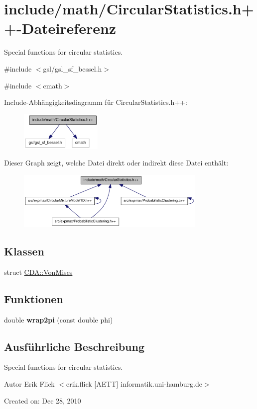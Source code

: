 \hypertarget{CircularStatistics_8h_09_09}{
\section{include/math/CircularStatistics.h++-\/Dateireferenz}
\label{CircularStatistics_8h_09_09}
}


Special functions for circular statistics.  


{\ttfamily \#include $<$gsl/gsl\_\-sf\_\-bessel.h$>$}\par
{\ttfamily \#include $<$cmath$>$}\par
Include-\/Abhängigkeitsdiagramm für CircularStatistics.h++:\nopagebreak
\begin{figure}[H]
\begin{center}
\leavevmode
\includegraphics[width=111pt]{CircularStatistics_8h_09_09__incl}
\end{center}
\end{figure}
Dieser Graph zeigt, welche Datei direkt oder indirekt diese Datei enthält:\nopagebreak
\begin{figure}[H]
\begin{center}
\leavevmode
\includegraphics[width=258pt]{CircularStatistics_8h_09_09__dep__incl}
\end{center}
\end{figure}
\subsection*{Klassen}
\begin{DoxyCompactItemize}
\item 
struct \hyperlink{structCDA_1_1VonMises}{CDA::VonMises}
\end{DoxyCompactItemize}
\subsection*{Funktionen}
\begin{DoxyCompactItemize}
\item 
\hypertarget{CircularStatistics_8h_09_09_a53bb96d37a7af4fd27ce73a33a69c63a}{
double {\bfseries wrap2pi} (const double phi)}
\label{CircularStatistics_8h_09_09_a53bb96d37a7af4fd27ce73a33a69c63a}

\end{DoxyCompactItemize}


\subsection{Ausführliche Beschreibung}
Special functions for circular statistics. \begin{DoxyAuthor}{Autor}
Erik Flick $<$erik.flick \mbox{[}AETT\mbox{]} informatik.uni-\/hamburg.de$>$
\end{DoxyAuthor}
Created on: Dec 28, 2010 